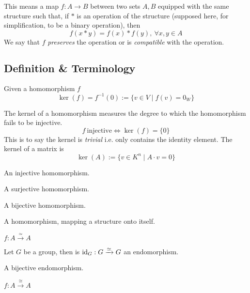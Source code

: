 This means a map \(f: A \to B\) between two sets \(A, B\) equipped with the same structure such that, if \(\ast\) is an operation of the structure (supposed here, for simplification, to be a binary operation), then
\[f(x\ast y) = f(x) \ast f(y),~\forall x,y \in A\]
We say that \(f\) \emph{preserves} the operation or is \emph{compatible} with the operation.

\subsection{Definition \& Terminology}
\begin{definition}
   Given a homomorphism \(f\)
   \[\ker(f) = f^{-1}(0) := \{v \in V \mid f(v) = 0_W\}\]
\end{definition}
\begin{remark}[Intuition]
   The kernel of a homomorphism measures the degree to which the homomorphism fails to be injective.
   \[f~\text{injective} \iff \ker(f) = \{0\}\]
   This is to say the kernel is \emph{trivial} i.e. only contains the identity element.
   The kernel of a matrix is
   \[\ker(A) := \{v \in K^n \mid A \cdot v = 0\}\]
\end{remark}

\begin{definition}[Monomorphism]
   An injective homomorphism.
\end{definition}

\begin{definition}[Epimorphism]
   A surjective homomorphism.
\end{definition}

\begin{definition}[Isomorphism]
   A bijective homomorphism.
\end{definition}

\begin{definition}[Endomorphism]
   A homomorphism, mapping a structure onto itself.
\end{definition}
\begin{remark}[Notation]
   \(f: A \xrightarrow{\simeq} A\)
\end{remark}
\begin{example}
   Let \(G\) be a group, then is \(\operatorname{id}_G: G \xrightarrow{\simeq} G\) an endomorphism.
\end{example}

\begin{definition}[Automorphism]
   A bijective endomorphism.
\end{definition}
\begin{remark}[Notation]
   \(f: A \xrightarrow{\cong} A\)
\end{remark}

